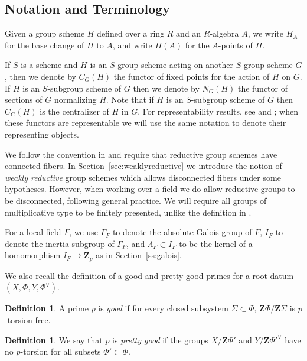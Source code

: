 \documentclass[11pt, letterpaper,english]{amsart}
\theoremstyle{plain}
\theoremstyle{definition}
\newtheorem{defn}[lem]{Definition}
\numberwithin{equation}{section}
\numberwithin{lem}{section}
\newcommand{\mathfont}{\mathbf}
\newcommand{\Z}{\mathfont Z}
\begin{document}
\subsection{Notation and Terminology}
Given a group scheme $H$ defined over a ring $R$ and an $R$-algebra $A$, we write $H_A$ for the base change of $H$ to $A$, and write $H(A)$ for the $A$-points of $H$.

If $S$ is a scheme and $H$ is an $S$-group scheme acting on another $S$-group scheme $G$, then we denote by $C_G(H)$ the functor of fixed points for the action of $H$ on $G$. If $H$ is an $S$-subgroup scheme of $G$ then we denote by $N_G(H)$ the functor of sections of $G$ normalizing $H$. Note that if $H$ is an $S$-subgroup scheme of $G$ then $C_G(H)$ is the centralizer of $H$ in $G$. For representability results, see \cite[Exp.\ XII, Proposition 9.2]{sga3} and \cite[Proposition 2.1.6]{conrad}; when these functors are representable we will use the same notation to denote their representing objects.

We follow the convention in \cite{sga3}
and require that reductive group schemes have connected fibers.  In Section~\ref{sec:weaklyreductive} we introduce the notion of \textit{weakly reductive} group schemes which allows disconnected fibers under some hypotheses.  
However, when working over a field we do allow reductive groups to be disconnected, following general practice. We will require all groups of multiplicative type to be finitely presented, unlike the definition in \cite[Exp.\ IX]{sga3}.

%

For a local field $F$, we use $\Gamma_F$ to denote the absolute Galois group of $F$, $I_F$ to denote the inertia subgroup of $\Gamma_F$, and $\Lambda_F \subset I_F$ to be the kernel of a homomorphism $I_F \to \Z_p$ as in Section~\ref{ss:galois}.

We also recall the definition of a good and pretty good primes for a root datum $(X,\Phi,Y,\Phi^\vee)$. 

\begin{defn}\label{def:goodprimes for G} 
A prime $p$ is \emph{good} if for every closed subsystem $\Sigma \subset \Phi$, $\Z\Phi/\Z\Sigma$ is $p$-torsion free. 
\end{defn}

\begin{defn} \label{def:prettygoodprimes}
We say that $p$ is \emph{pretty good} if the groups $X/\Z \Phi'$ and $Y/\Z {\Phi'}^\vee$ have no $p$-torsion for all subsets $\Phi' \subset \Phi$.
\end{defn}
\end{document}
